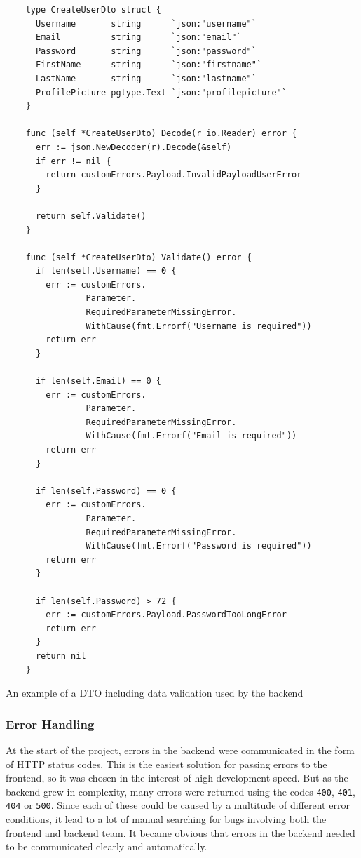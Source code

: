 \begin{listing}[htbp]
  \centering{}
  \begin{minipage}{0.7\textwidth}
  \begin{verbatim}
    type CreateUserDto struct {
      Username       string      `json:"username"`
      Email          string      `json:"email"`
      Password       string      `json:"password"`
      FirstName      string      `json:"firstname"`
      LastName       string      `json:"lastname"`
      ProfilePicture pgtype.Text `json:"profilepicture"`
    }

    func (self *CreateUserDto) Decode(r io.Reader) error {
      err := json.NewDecoder(r).Decode(&self)
      if err != nil {
        return customErrors.Payload.InvalidPayloadUserError
      }

      return self.Validate()
    }

    func (self *CreateUserDto) Validate() error {
      if len(self.Username) == 0 {
        err := customErrors.
                Parameter.
                RequiredParameterMissingError.
                WithCause(fmt.Errorf("Username is required"))
        return err
      }

      if len(self.Email) == 0 {
        err := customErrors.
                Parameter.
                RequiredParameterMissingError.
                WithCause(fmt.Errorf("Email is required"))
        return err
      }

      if len(self.Password) == 0 {
        err := customErrors.
                Parameter.
                RequiredParameterMissingError.
                WithCause(fmt.Errorf("Password is required"))
        return err
      }

      if len(self.Password) > 72 {
        err := customErrors.Payload.PasswordTooLongError
        return err
      }
      return nil
    }

  \end{verbatim}
  \end{minipage}
  \caption{An example of a DTO including data validation used by the backend}
  \label{listing:dto_example}
\end{listing}

\subsubsection{Error Handling}

At the start of the project, errors in the backend were communicated in the form
of HTTP status codes. This is the easiest solution for passing errors to the
frontend, so it was chosen in the interest of high development speed. But as the
backend grew in complexity, many errors were returned using the codes
\texttt{400}, \texttt{401}, \texttt{404} or \texttt{500}. Since each of these
could be caused by a multitude of different error conditions, it lead to a lot
of manual searching for bugs involving both the frontend and backend team. It
became obvious that errors in the backend needed to be communicated clearly and
automatically.

